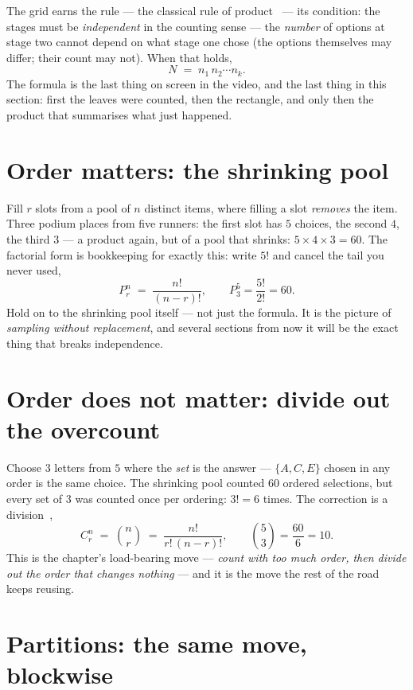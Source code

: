 \begin{narrative}
The grid earns the rule — the classical rule of
product~\cite{combinatorics-rule-of-product} — its condition: the stages
must be \emph{independent} in the counting sense — the \emph{number} of options at
stage two cannot depend on what stage one chose (the options themselves
may differ; their count may not). When that holds,
\[
  N \;=\; n_1\, n_2 \cdots n_k .
\]
The formula is the last thing on screen in the video, and the last thing
in this section: first the leaves were counted, then the rectangle, and
only then the product that summarises what just happened.

\section{Order matters: the shrinking pool}

Fill $r$ slots from a pool of $n$ distinct items, where filling a slot
\emph{removes} the item. Three podium places from five runners: the first
slot has $5$ choices, the second $4$, the third $3$ — a product again, but
of a pool that shrinks:
$5 \times 4 \times 3 = 60$. The factorial form is bookkeeping for exactly
this: write $5!$ and cancel the tail you never used,
\[
  P^n_r \;=\; \frac{n!}{(n-r)!},
  \qquad
  P^5_3 = \frac{5!}{2!} = 60 .
\]
Hold on to the shrinking pool itself — not just the formula. It is the
picture of \emph{sampling without replacement}, and several sections from
now it will be the exact thing that breaks independence.

\section{Order does not matter: divide out the overcount}

Choose $3$ letters from $5$ where the \emph{set} is the answer —
$\{A,C,E\}$ chosen in any order is the same choice. The shrinking pool
counted $60$ ordered selections, but every set of $3$ was counted once per
ordering: $3! = 6$ times. The correction is a
division~\cite{combinatorics-combination},
\[
  C^n_r \;=\; \binom{n}{r} \;=\; \frac{n!}{r!\,(n-r)!},
  \qquad
  \binom{5}{3} = \frac{60}{6} = 10 .
\]
This is the chapter's load-bearing move — \emph{count with too much order,
then divide out the order that changes nothing} — and it is the move the
rest of the road keeps reusing.

\section{Partitions: the same move, blockwise}


\end{narrative}

